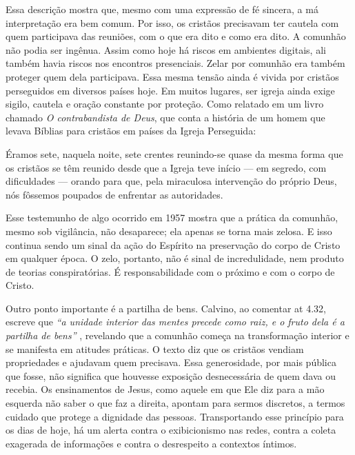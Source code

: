 Essa descrição mostra que, mesmo com uma expressão de fé sincera, a má interpretação era bem comum. Por isso, os cristãos precisavam ter cautela com quem participava das reuniões, com o que era dito e como era dito. A comunhão não podia ser ingênua. Assim como hoje há riscos em ambientes digitais, ali também havia riscos nos encontros presenciais. Zelar por comunhão era também proteger quem dela participava. Essa mesma tensão ainda é vivida por cristãos perseguidos em diversos países hoje. Em muitos lugares, ser igreja ainda exige sigilo, cautela e oração constante por proteção. Como relatado em um livro chamado \textit{O contrabandista de Deus}, que conta a história de um homem que levava Bíblias para cristãos em países da Igreja Perseguida:

\begin{citacao}
    Éramos sete, naquela noite, sete crentes reunindo-se quase da mesma forma que os cristãos se têm reunido desde que a Igreja teve início — em segredo, com dificuldades — orando para que, pela miraculosa intervenção do próprio Deus, nós fôssemos poupados de enfrentar as autoridades. \cite[p.~166]{brotherAndrew}
\end{citacao}

Esse testemunho de algo ocorrido em 1957 mostra que a prática da comunhão, mesmo sob vigilância, não desaparece; ela apenas se torna mais zelosa. E isso continua sendo um sinal da ação do Espírito na preservação do corpo de Cristo em qualquer época. O zelo, portanto, não é sinal de incredulidade, nem produto de teorias conspiratórias. É responsabilidade com o próximo e com o corpo de Cristo.

Outro ponto importante é a partilha de bens. Calvino, ao comentar \gls{at} 4.32, escreve que \textit{``a unidade interior das mentes precede como raiz, e o fruto dela é a partilha de bens''} \cite{calvinoAtos4}, revelando que a comunhão começa na transformação interior e se manifesta em atitudes práticas. O texto diz que os cristãos vendiam propriedades e ajudavam quem precisava. Essa generosidade, por mais pública que fosse, não significa que houvesse exposição desnecessária de quem dava ou recebia. Os ensinamentos de Jesus, como aquele em que Ele diz para a mão esquerda não saber o que faz a direita, apontam para sermos discretos, a termos cuidado que protege a dignidade das pessoas. Transportando esse princípio para os dias de hoje, há um alerta contra o exibicionismo nas redes, contra a coleta exagerada de informações e contra o desrespeito a contextos íntimos.

